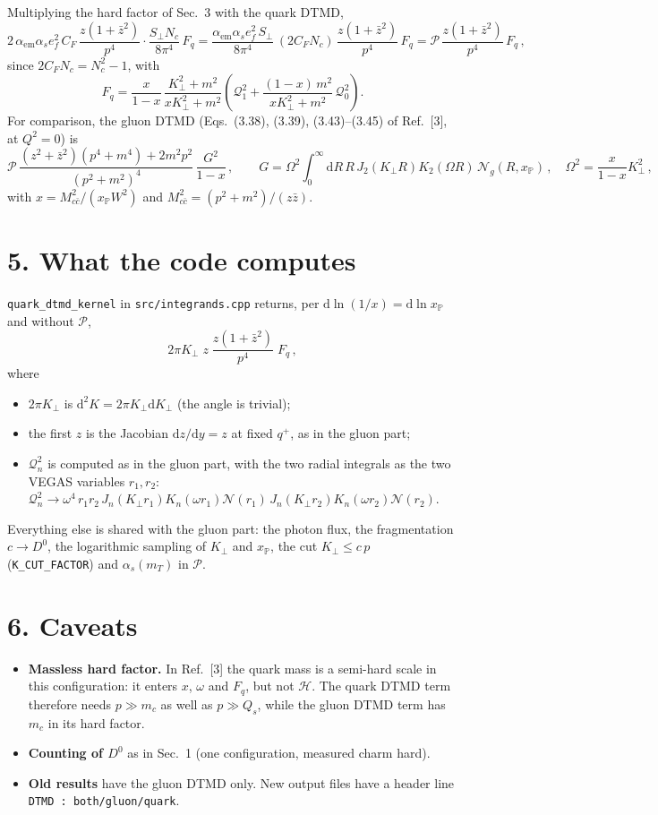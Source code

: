 \documentclass[12pt]{article}
\newcommand{\xpo}{x_{\mathbb{P}}}
\newcommand{\dd}{\mathrm{d}}
\begin{document}
Multiplying the hard factor of Sec.~3 with the quark DTMD,
\[
  2\,\alpha_{\mathrm{em}}\alpha_s e_f^2\,C_F\,\frac{z(1+\bar z^2)}{p^4}\cdot\frac{S_\perp N_c}{8\pi^4}\,F_q
  =\frac{\alpha_{\mathrm{em}}\alpha_s e_f^2\,S_\perp}{8\pi^4}\,(2C_FN_c)\,\frac{z(1+\bar z^2)}{p^4}\,F_q
  =\mathcal{P}\,\frac{z(1+\bar z^2)}{p^4}\,F_q\,,
\]
since $2C_FN_c=N_c^2-1$, with
\[
  F_q=\frac{x}{1-x}\,\frac{K_\perp^2+m^2}{xK_\perp^2+m^2}
  \left(\mathcal{Q}_1^2+\frac{(1-x)\,m^2}{xK_\perp^2+m^2}\,\mathcal{Q}_0^2\right).
\]
For comparison, the gluon DTMD (Eqs.~(3.38), (3.39), (3.43)--(3.45) of Ref.~[3], at $Q^2=0$) is
\[
  \mathcal{P}\,\frac{(z^2+\bar z^2)(p^4+m^4)+2m^2p^2}{(p^2+m^2)^4}\,\frac{G^2}{1-x}\,,\qquad
  G=\Omega^2\!\int_0^\infty\!\dd R\,R\,J_2(K_\perp R)K_2(\Omega R)\,\mathcal{N}_g(R,\xpo)\,,\quad
  \Omega^2=\frac{x}{1-x}K_\perp^2\,,
\]
with $x=M_{c\bar c}^2/(\xpo W^2)$ and $M_{c\bar c}^2=(p^2+m^2)/(z\bar z)$.

\section*{5. What the code computes}

\texttt{quark\_dtmd\_kernel} in \texttt{src/integrands.cpp} returns, per $\dd\ln(1/x)=\dd\ln\xpo$ and
without $\mathcal{P}$,
\[
  2\pi K_\perp\;z\;\frac{z(1+\bar z^2)}{p^4}\;F_q\,,
\]
where
\begin{itemize}
\item $2\pi K_\perp$ is $\dd^2K=2\pi K_\perp\dd K_\perp$ (the angle is trivial);
\item the first $z$ is the Jacobian $\dd z/\dd y=z$ at fixed $q^+$, as in the gluon part;
\item $\mathcal{Q}_n^2$ is computed as in the gluon part, with the two radial integrals as the two
  VEGAS variables $r_1,r_2$:
  $\mathcal{Q}_n^2\to\omega^4\,r_1r_2\,J_n(K_\perp r_1)K_n(\omega r_1)\mathcal{N}(r_1)\,
  J_n(K_\perp r_2)K_n(\omega r_2)\mathcal{N}(r_2)$.
\end{itemize}
Everything else is shared with the gluon part: the photon flux, the fragmentation $c\to D^0$, the
logarithmic sampling of $K_\perp$ and $\xpo$, the cut $K_\perp\leq c\,p$ (\texttt{K\_CUT\_FACTOR}) and
$\alpha_s(m_T)$ in $\mathcal{P}$.

\section*{6. Caveats}

\begin{itemize}
\item \textbf{Massless hard factor.} In Ref.~[3] the quark mass is a semi-hard scale in this
  configuration: it enters $x$, $\omega$ and $F_q$, but not $\mathcal{H}$. The quark DTMD term therefore
  needs $p\gg m_c$ as well as $p\gg Q_s$, while the gluon DTMD term has $m_c$ in its hard factor.
\item \textbf{Counting of $D^0$} as in Sec.~1 (one configuration, measured charm hard).
\item \textbf{Old results} have the gluon DTMD only. New output files have a header line
  \texttt{DTMD : both/gluon/quark}.
\end{itemize}
\end{document}
